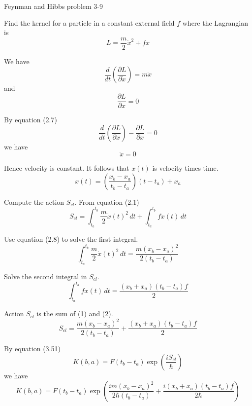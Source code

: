 \documentclass[12pt]{article}
\begin{document}
Feynman and Hibbs problem 3-9


Find the kernel for a particle in a constant external field $f$
where the Lagrangian is
\begin{equation*}
L=\frac{m}{2}\dot x^2+fx
\end{equation*}

We have
\begin{equation*}
\frac{d}{dt}\left(\frac{\partial L}{\partial\dot x}\right)=m\ddot x
\end{equation*}
and
\begin{equation*}
\frac{\partial L}{\partial x}=0
\end{equation*}

\noindent
By equation (2.7)
\begin{equation*}
\frac{d}{dt}\left(\frac{\partial L}{\partial\dot x}\right)-\frac{\partial L}{\partial x}=0
\end{equation*}
we have
\begin{equation*}
\ddot x=0
\end{equation*}

\noindent
Hence velocity is constant. It follows that $x(t)$ is velocity times time.
\begin{equation*}
x(t)=\left(\frac{x_b-x_a}{t_b-t_a}\right)(t-t_a)+x_a
\end{equation*}

\noindent
Compute the action $S_{cl}$.
From equation (2.1)
\begin{equation*}
S_{cl}=\int_{t_a}^{t_b}\frac{m}{2}\dot x(t)^2\,dt
+\int_{t_a}^{t_b}fx(t)\,dt
\end{equation*}


Use equation (2.8) to solve the first integral.
\begin{equation*}
\int_{t_a}^{t_b}\frac{m}{2}\dot x(t)^2\,dt
=\frac{m(x_b-x_a)^2}{2(t_b-t_a)}
\tag{1}
\end{equation*}


Solve the second integral in $S_{cl}$.
\begin{equation*}
\int_{t_a}^{t_b}fx(t)\,dt=\frac{(x_b+x_a)(t_b-t_a)f}{2}
\tag{2}
\end{equation*}


Action $S_{cl}$ is the sum of (1) and (2).
\begin{equation*}
S_{cl}=\frac{m(x_b-x_a)^2}{2(t_b-t_a)}+\frac{(x_b+x_a)(t_b-t_a)f}{2}
\end{equation*}


By equation (3.51)
\begin{equation*}
K(b,a)=F(t_b-t_a)\exp\left(\frac{iS_{cl}}{\hbar}\right)
\end{equation*}
we have
\begin{equation*}
K(b,a)=F(t_b-t_a)\exp\left(\frac{im(x_b-x_a)^2}{2\hbar(t_b-t_a)}+\frac{i(x_b+x_a)(t_b-t_a)f}{2\hbar}\right)
\tag{3}
\end{equation*}
\end{document}
